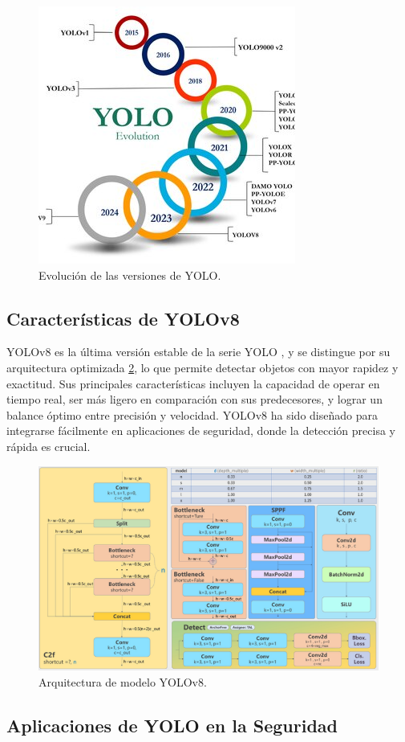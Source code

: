\begin{figure}[!ht]
  \centering
  \includegraphics[width=.49\linewidth]{images/yolo_evolution.jpg}
  \caption{Evolución de las versiones de YOLO.}
  \label{fig:yolo_evolution}
\end{figure}

\subsection{Características de YOLOv8}

YOLOv8 es la última versión estable de la serie YOLO \cite{jiang2022review}, y se distingue por su arquitectura optimizada \ref{fig:yolo_architecture}, lo que permite detectar objetos con mayor rapidez y exactitud. Sus principales características incluyen la capacidad de operar en tiempo real, ser más ligero en comparación con sus predecesores, y lograr un balance óptimo entre precisión y velocidad. YOLOv8 ha sido diseñado para integrarse fácilmente en aplicaciones de seguridad, donde la detección precisa y rápida es crucial.

\begin{figure}[!ht]
  \centering
  \includegraphics[width=.49\linewidth]{images/yolo_architecture.png}
  \caption{Arquitectura de modelo YOLOv8.}
  \label{fig:yolo_architecture}
\end{figure}

\subsection{Aplicaciones de YOLO en la Seguridad}


